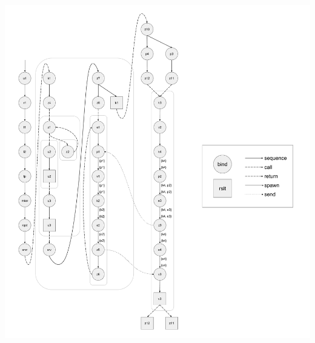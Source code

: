 \documentclass[letterpaper, 11pt]{extarticle}
\begin{document}
\includegraphics[width=1\textwidth]{cml-liveness-analysis-k4.pdf} \\\\\\\\\\\\
\end{document}
